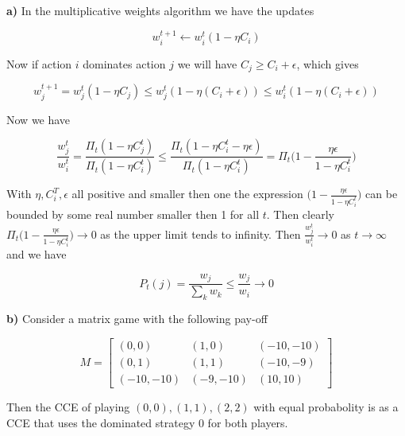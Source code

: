 \textbf{a)} In the multiplicative weights algorithm we have the updates

$$
w_i^{t+1} \leftarrow w_i^t (1- \eta C_i)
$$

Now if action $i$ dominates action $j$ we will have $C_j \ge C_i + \epsilon$, which gives

$$
w_j^{t+1} =  w_j^t (1- \eta C_j) \le w_j^t (1- \eta (C_i + \epsilon)) \le w_i^t (1- \eta (C_i + \epsilon))
$$

Now we have

$$
\frac{w_j^t}{w_i^t} = \frac{ \Pi_t (1- \eta C_j^t)}{\Pi_t (1- \eta C_i^t)} \le \frac{ \Pi_t (1- \eta C_i^t - \eta \epsilon)}{\Pi_t (1- \eta C_i^t)} = \Pi_t \bigg(1- \frac{\eta \epsilon}{1- \eta C_i^t} \bigg)
$$

With $\eta, C_i^T, \epsilon$ all positive and smaller then one the expression $\big(1- \frac{\eta \epsilon}{1- \eta C_i^t} \big)$ can be bounded by some real number smaller then 1 for all $t$. Then clearly $\Pi_t \big(1- \frac{\eta \epsilon}{1- \eta C_i^t} \big) \rightarrow 0$ as the upper limit tends to infinity. Then $\frac{w_j^t}{w_i^t} \rightarrow 0$ as $t \rightarrow \infty$ and we have

$$
P_t(j) = \frac{w_j}{\sum_k w_k} \le \frac{w_j}{w_i} \rightarrow 0
$$


\textbf{b)} Consider a matrix game with the following pay-off

$$
   M=
  \left[ {\begin{array}{cc}
   (0,0) & (1,0) & (-10,-10) \\ (0,1) & (1,1) & (-10,-9) \\ (-10,-10) & (-9,-10) & (10,10) \end{array} } \right]
$$


Then the CCE of playing $(0,0), (1,1), (2,2)$ with equal probabolity is as a CCE that uses the dominated strategy $0$ for both players.


